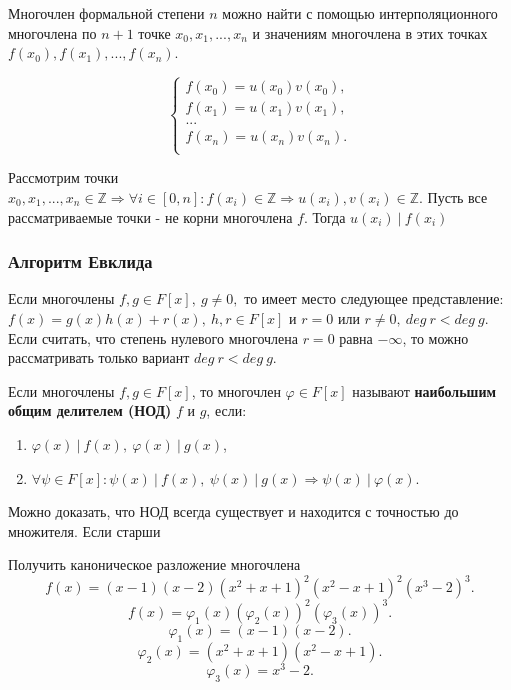 \documentclass[12pt]{article}
\begin{document}
\begin{predp}
Многочлен формальной степени $n$ можно найти с помощью интерполяционного многочлена по $n + 1$ точке \mbox{$x_0, x_1, ..., x_{n}$} и значениям многочлена в этих точках \mbox{$f(x_0), f(x_1), ..., f(x_n)$.}
\end{predp}

$$\begin{cases}
f(x_0) = u(x_0)v(x_0), \\
f(x_1) = u(x_1)v(x_1), \\
... \\
f(x_n) = u(x_n)v(x_n). \\
\end{cases}$$

Рассмотрим точки $x_0, x_1, ..., x_{n} \in \mathbb{Z} \Rightarrow \forall i \in [0, n]: f(x_i) \in \mathbb{Z} \Rightarrow u(x_i), v(x_i) \in \mathbb{Z}.$ Пусть все рассматриваемые точки - не корни многочлена $f$. Тогда $u(x_i)~|~f(x_i)$

\subsubsection{Алгоритм Евклида}

\hspace{0.6cm}Если многочлены $f, g \in F[x],~g \neq 0,$ то имеет место следующее представление: \mbox{$f(x) = g(x)h(x) + r(x)$}$,~h, r \in F[x]$ и $r = 0$ или $r \neq 0,~deg~r < deg~g.$
Если считать, что степень нулевого многочлена $r = 0$ равна $-\infty$, то можно рассматривать только вариант $deg~r < deg~g$.

\begin{defn}
Если многочлены $f, g \in F[x]$, то многочлен $\varphi \in F[x]$ называют \textbf{наибольшим общим делителем (НОД)} $f$ и $g$, если:
\begin{enumerate}
\item $\varphi(x)~|~f(x),~ \varphi(x)~|~g(x)$,
\item $\forall \psi \in F[x]: \psi(x)~|~f(x),~ \psi(x)~|~g(x) \Rightarrow \psi(x)~|~\varphi(x)$.
\end{enumerate}
\end{defn}
Можно доказать, что НОД всегда существует и находится с точностью до множителя. Если старши

\begin{examp}
Получить каноническое разложение многочлена $$f(x) = (x - 1)(x - 2)(x^2 + x + 1)^2(x^2 - x + 1)^2(x^3 - 2)^3.$$
$$f(x) = \varphi_1(x)(\varphi_2(x))^2(\varphi_3(x))^3.$$
$$\varphi_1(x) = (x - 1)(x - 2).$$
$$\varphi_2(x) = (x^2 + x + 1)(x^2 - x + 1).$$
$$\varphi_3(x) = x^3 - 2.$$
\end{examp}
\end{document}
